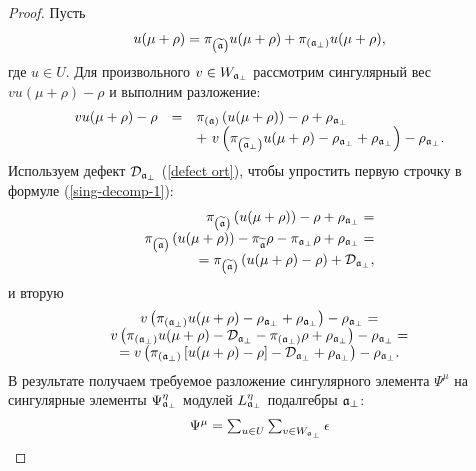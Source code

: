 \documentclass[12pt]{article}
\theoremstyle{definition}
\newcommand{\af}{\mathfrak{a}}
\newcommand{\aft}{\widetilde{\mathfrak{a}}}
\begin{document}
\begin{proof}
Пусть
\[
u(\mu +\rho )=\pi _{\left( \aft\right) }u(\mu +\rho )+\pi _{\left(
\frak{a}_{\perp }\right) }u(\mu +\rho ),
\]
где $u\in U$. Для произвольного  $v\in W_{\frak{a}_{\bot }}$ рассмотрим сингулярный вес  $vu(\mu +\rho )-\rho $ и выполним разложение:
\begin{equation}
\begin{array}{lcl}
vu(\mu +\rho )-\rho  & = & \pi _{\left( \frak{a}\right) }\left( u(\mu +\rho
)\right) -\rho +\rho _{\frak{a}_{\perp }}
\\
&  & +\ v\left( \pi _{\left( \aft_{\perp }\right) }u(\mu
+\rho )-\rho _{\frak{a}_{\perp }}+\rho _{\frak{a}_{\perp }}\right) -\rho _{%
\frak{a}_{\perp }} .
\end{array}
\label{sing-decomp-1}
\end{equation}
Используем дефект $\mathcal{D}_{\frak{a}_{\bot }}$ (\ref{defect ort}), чтобы упростить первую строчку в формуле (\ref{sing-decomp-1}):
\[
\begin{array}{r}
\pi _{\left( \aft\right) }\left( u(\mu +\rho )\right) -\rho +\rho _{%
\frak{a}_{\perp }}= \\
\pi _{\left( \aft\right) }\left( u(\mu +\rho )\right) -\pi _{\aft%
}\rho -\pi _{\af_{\bot }}\rho +\rho _{\frak{a}_{\bot }}= \\
=\pi _{\left( \aft\right) }\left( u(\mu +\rho )-\rho \right) +\mathcal{D}%
_{\frak{a}_{\bot }},
\end{array}
\]
и вторую
\[
\begin{array}{c}
v\left( \pi _{\left( \frak{a}_{\perp }\right) }u(\mu +\rho
)-\rho _{\frak{a}_{\perp }}+\rho _{\frak{a}_{\perp }}\right) -\rho _{\frak{a}%
_{\perp }}= \\
v\left( \pi _{\left( \frak{a}_{\bot }\right) }u(\mu +\rho )-%
\mathcal{D}_{\frak{a}_{\bot }}-\pi _{\left( \frak{a}_{\bot }\right) }\rho
+\rho _{\frak{a}_{\bot }}\right)
-\rho _{\frak{a}_{\bot }}= \\
=v\left( \pi _{\left( \frak{a}_{\bot }\right) }\left[ u(\mu
+\rho )-\rho \right] -\mathcal{D}_{\frak{a}_{\bot }}+\rho _{\frak{a}_{\bot
}}\right) -\rho _{\frak{a}_{\bot }}.
\end{array}
\]
В результате получаем требуемое разложение сингулярного элемента $\Psi ^{\mu }$ на сингулярные элементы $\Psi_{\frak{a}_{\perp}}^{\eta}$ модулей $L_{\frak{a}_{\perp }}^{\eta }$ подалгебры $\frak{a}_{\perp }$: 
\begin{equation}
\begin{array}{l}
\Psi ^{\mu }=\sum_{u\in U}\sum_{v\in W_{\frak{a}_{\perp }}}\epsilon

\end{array}
\end{equation}
\end{proof}
\end{document}
